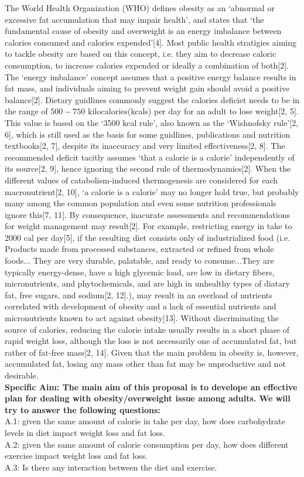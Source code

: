 \documentclass[11pt]{article}  %
\newcommand{\inden}[1]{\mbox{} \hspace{#1} } %
\begin{document}
The World Health Organization (WHO) defines obesity as an `abnormal or excessive fat accumulation that may impair health', and states that `the fundamental cause of obesity and overweight is an energy imbalance between calories consumed and calories expended'[4]. Most public health stratigies aiming to tackle obesity are based on this concept, i.e. they aim to decrease caloric consumption, to increase calories expended or ideally a combination of both[2]. The `energy imbalance' concept assumes that a positive energy balance results in fat mass, and individuals aiming to prevent weight gain should avoid a positive balance[2]. Dietary guidlines commonly suggest the calories deficiet needs to be in the range of $500-750$ kilocalories(kcals) per day for an adult to lose weight[2, 5]. This value is based on the `3500 kcal rule', also known as the `Wishnofsky rule'[2, 6], which is still used as the basis for some guidlines, publications and nutrition textbooks[2, 7], despite its inaccuracy and very limited effectiveness[2, 8]. The recommended deficit tacitly assumes `that a calorie is a calorie' independently of its source[2, 9], hence ignoring the second rule of thermodynamics[2]. When the different values of catabolism-induced thermogenesis are considered for each macronutrient[2, 10], `a calorie is a calorie' may no longer hold true, but probably many among the common population and even some nutrition professionals ignore this[7, 11]. By consequence, inacurate assessments and recommendations for weight management may result[2]. For example, restricting energy in take to $2000$ cal per day[5], if the resulting diet consists only of industrialized food (i.e. Products made from processed substances, extracted or refined from whole foods... They are very durable, palatable, and ready to consume...They are typically energy-dense, have a high glycemic load, are low in dietary fibers, micronutrients, and phytochemicals, and are high in unhealthy types of diatary fat, free sugars, and sodium[2, 12].), may result in an overload of nutrients correlated with development of obesity and a lack of essential nutrients and micronutrients known to act against obesity[13]. Without discriminating the source of calories, reducing the calorie intake usually results in a short phase of rapid weight loss, although the loss is not necessarily one of accumulated fat, but rather of fat-free mass[2, 14]. Given that the main problem in obesity is, however, accumulated fat, losing any mass other than fat may be unproductive and not desirable.\\
\textbf{Specific Aim: The main aim of this proposal is to develope an effective plan for dealing with obesity/overweight issue among adults. We will try to answer the following questions:}\\
\inden{2em} A.1: given the same amount of calorie in take per day, how does carbohydrate levels in diet impact weight loss and fat loss.\\
\inden{2em}A.2: given the same amount of calorie consumption per day, how does different exercise  impact weight loss and fat loss.\\
\inden{2em} A.3: Is there any interaction between the diet and exercise.
\end{document}
